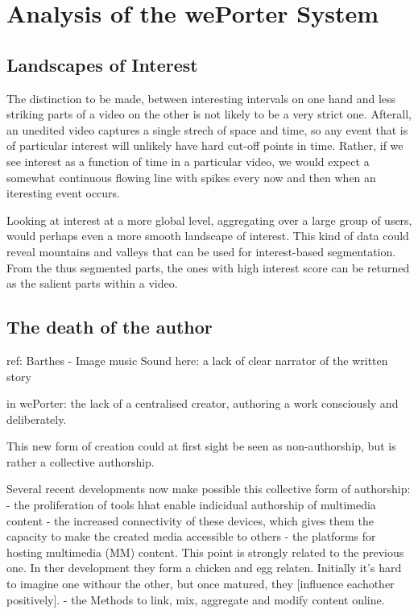 \section{Analysis of the wePorter System}

\subsection{Landscapes of Interest}

The distinction to be made, between interesting intervals on one hand and less striking parts of a video on the other is not likely to be a very strict one. Afterall, an unedited video captures a single strech of space and time, so any event that is of particular interest will unlikely have hard cut-off points in time. Rather, if we see interest as a function of time in a particular video, we would expect a somewhat continuous flowing line with spikes every now and then when an iteresting event occurs. 

Looking at interest at a more global level, aggregating over a large group of users, would perhaps even a more smooth landscape of interest. This kind of data could reveal mountains and valleys that can be used for interest-based segmentation. From the thus segmented parts, the ones with high interest score can be returned as the salient parts within a video.

\subsection{The death of the author}
ref: Barthes - Image music Sound
here: a lack of clear narrator of the written story

in wePorter: the lack of a centralised creator, authoring a work consciously and deliberately.

This new form of creation could at first sight be seen as non-authorship, but is rather a collective authorship. 

Several recent developments now make possible this collective form of authorship:
- the proliferation of tools hhat enable indicidual authorship of multimedia content
- the increased connectivity of these devices, which gives them the capacity to make the created media accessible to others
- the platforms for hosting multimedia (MM) content. This point is strongly related to the previous one. In ther development they form a chicken and egg relaten. Initially it's hard to imagine one withour the other, but once matured, they [influence eachother positively].
- the Methods to link, mix, aggregate and modify content online.

